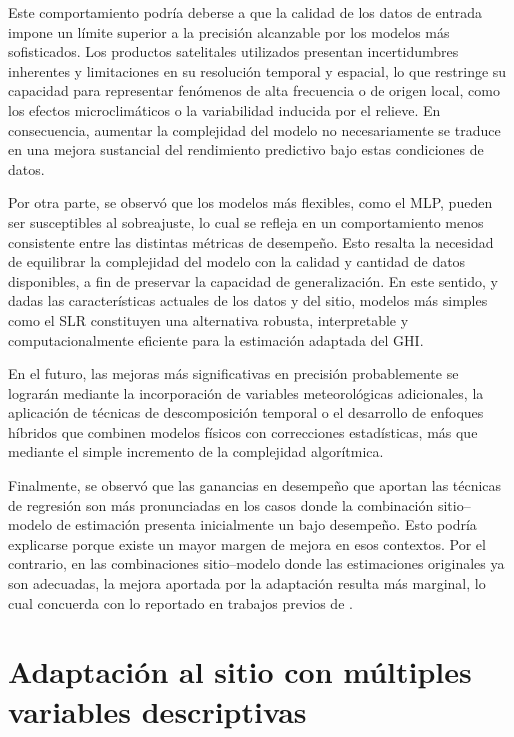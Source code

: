 \documentclass[letterpaper,12pt, twoside]{report}
\providecommand{\DIFdeltex}[1]{{\protect\color{red} \scriptsize #1}} %
\providecommand{\DIFdel}[1]{\texorpdfstring{\DIFdeltex{#1}}{}} %
\begin{document}
\DIFdel{Este comportamiento podría deberse a que la calidad de los datos de entrada impone un límite superior a la precisión alcanzable por los modelos más sofisticados. Los productos satelitales utilizados presentan incertidumbres inherentes y limitaciones en su resolución temporal y espacial, lo que restringe su capacidad para representar fenómenos de alta frecuencia o de origen local, como los efectos microclimáticos o la variabilidad inducida por el relieve. En consecuencia, aumentar la complejidad del modelo no necesariamente se traduce en una mejora sustancial del rendimiento predictivo bajo estas condiciones de datos.
}%

\DIFdel{Por otra parte, se observó que los modelos más flexibles, como el MLP, pueden ser susceptibles al sobreajuste, lo cual se refleja en un comportamiento menos consistente entre las distintas métricas de desempeño. Esto resalta la necesidad de equilibrar la complejidad del modelo con la calidad y cantidad de datos disponibles, a fin de preservar la capacidad de generalización. En este sentido, y dadas las características actuales de los datos y del sitio, modelos más simples como el SLR constituyen una alternativa robusta, interpretable y computacionalmente eficiente para la estimación adaptada del GHI.
}%

\DIFdel{En el futuro, las mejoras más significativas en precisión probablemente se lograrán mediante la incorporación de variables meteorológicas adicionales, la aplicación de técnicas de descomposición temporal o el desarrollo de enfoques híbridos que combinen modelos físicos con correcciones estadísticas, más que mediante el simple incremento de la complejidad algorítmica.
}%

\DIFdel{Finalmente, se observó que las ganancias en desempeño que aportan las técnicas de regresión son más pronunciadas en los casos donde la combinación sitio–modelo de estimación presenta inicialmente un bajo desempeño. Esto podría explicarse porque existe un mayor margen de mejora en esos contextos. Por el contrario, en las combinaciones sitio–modelo donde las estimaciones originales ya son adecuadas, la mejora aportada por la adaptación resulta más marginal, lo cual concuerda con lo reportado en trabajos previos de \citet{SALAMALIKIS2022, POLO2020}.
}%

\section{\DIFdel{Adaptación al sitio con múltiples variables descriptivas}}%
\addtocounter{section}{-1}%
\end{document}
